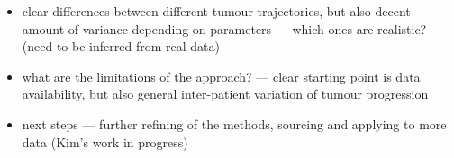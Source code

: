 \begin{itemize}
    \item clear differences between different tumour trajectories, but also
        decent amount of variance depending on parameters --- which ones are
        realistic? (need to be inferred from real data)
    \item what are the limitations of the approach? --- clear starting point is
        data availability, but also general inter-patient variation of tumour
        progression
    \item next steps --- further refining of the methods, sourcing and applying
        to more data (Kim's work in progress)
\end{itemize}

